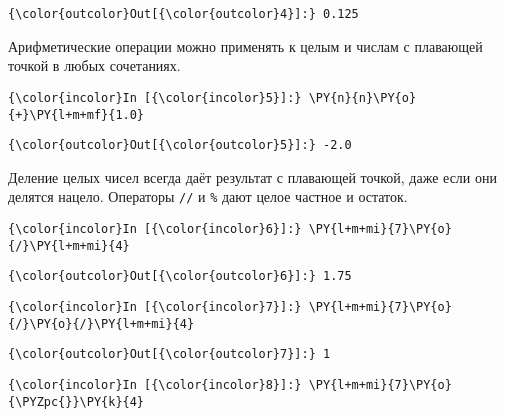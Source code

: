             \begin{Verbatim}[commandchars=\\\{\}]
{\color{outcolor}Out[{\color{outcolor}4}]:} 0.125
\end{Verbatim}
        
    Арифметические операции можно применять к целым и числам с плавающей
точкой в любых сочетаниях.

    \begin{Verbatim}[commandchars=\\\{\}]
{\color{incolor}In [{\color{incolor}5}]:} \PY{n}{n}\PY{o}{+}\PY{l+m+mf}{1.0}
\end{Verbatim}

            \begin{Verbatim}[commandchars=\\\{\}]
{\color{outcolor}Out[{\color{outcolor}5}]:} -2.0
\end{Verbatim}
        
    Деление целых чисел всегда даёт результат с плавающей точкой, даже если
они делятся нацело. Операторы \texttt{//} и \texttt{\%} дают целое
частное и остаток.

    \begin{Verbatim}[commandchars=\\\{\}]
{\color{incolor}In [{\color{incolor}6}]:} \PY{l+m+mi}{7}\PY{o}{/}\PY{l+m+mi}{4}
\end{Verbatim}

            \begin{Verbatim}[commandchars=\\\{\}]
{\color{outcolor}Out[{\color{outcolor}6}]:} 1.75
\end{Verbatim}
        
    \begin{Verbatim}[commandchars=\\\{\}]
{\color{incolor}In [{\color{incolor}7}]:} \PY{l+m+mi}{7}\PY{o}{/}\PY{o}{/}\PY{l+m+mi}{4}
\end{Verbatim}

            \begin{Verbatim}[commandchars=\\\{\}]
{\color{outcolor}Out[{\color{outcolor}7}]:} 1
\end{Verbatim}
        
    \begin{Verbatim}[commandchars=\\\{\}]
{\color{incolor}In [{\color{incolor}8}]:} \PY{l+m+mi}{7}\PY{o}{\PYZpc{}}\PY{k}{4}
\end{Verbatim}

